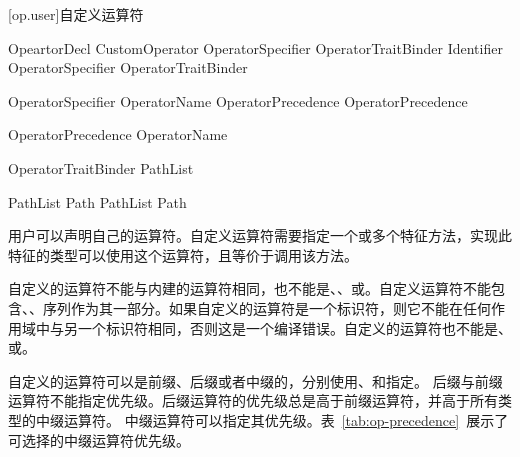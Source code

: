 [op.user]{自定义运算符}

\begin{bnf}{OpeartorDecl}
     CustomOperator OperatorSpecifier OperatorTraitBinder \terminal{;} \br
     Identifier OperatorSpecifier OperatorTraitBinder \terminal{;}
\end{bnf}

\begin{bnf}{OperatorSpecifier}
     \br
     \br
     \br
     \terminal{(} OperatorName \terminal{)} \br
     \terminal{(} OperatorPrecedence \terminal{,} OperatorPrecedence \terminal{)}
\end{bnf}

\begin{bnf}{OperatorPrecedence}
    OperatorName \br
    \terminal{_}
\end{bnf}

\begin{bnf}{OperatorTraitBinder}
    \terminal{=} PathList
\end{bnf}

\begin{bnf}{PathList}
    Path \br
    PathList \terminal{,} Path
\end{bnf}

\pnum
用户可以声明自己的运算符。自定义运算符需要指定一个或多个特征方法，实现此特征的类型可以使用这个运算符，且等价于调用该方法。

\pnum
自定义的运算符不能与内建的运算符相同，也不能是\tcode{\^}、\tcode{->}、\tcode{=>}或。自定义运算符不能包含\tcode{/*}、\tcode{*/}、\tcode{//}序列作为其一部分。如果自定义的运算符是一个标识符，则它不能在任何作用域中与另一个标识符相同，否则这是一个编译错误。自定义的运算符也不能是、或。

\pnum
自定义的运算符可以是前缀、后缀或者中缀的，分别使用、和指定。
后缀与前缀运算符不能指定优先级。后缀运算符的优先级总是高于前缀运算符，并高于所有类型的中缀运算符。
中缀运算符可以指定其优先级。表~\ref{tab:op-precedence}~展示了可选择的中缀运算符优先级。

